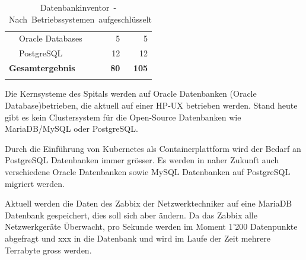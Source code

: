\begin{longtable}{@{}llrr@{}}
             & \Gls{Oracle Database}s             & 5                                                                   & 5                                            \\
             & \Gls{PostgreSQL}                   & 12                                                                  & 12                                           \\* \midrule
\multicolumn{2}{l}{\textbf{Gesamtergebnis}} & \textbf{80}                                                         & \textbf{105}                                 \\* \bottomrule
\caption{\mbox{Datenbankinventor - Nach Betriebssystemen aufgeschlüsselt}}
\label{Datenbankinventar_per_OS}
\end{longtable}

Die Kernsysteme des Spitals werden auf Oracle Datenbanken (\Gls{Oracle Database})betrieben, die aktuell auf einer \Gls{HP-UX} betrieben werden.
Stand heute gibt es kein Clustersystem für die Open-Source Datenbanken wie \Gls{MariaDB}/\Gls{MySQL} oder \Gls{PostgreSQL}\@.

Durch die Einführung von \Gls{Kubernetes} als Containerplattform wird der Bedarf an \Gls{PostgreSQL} Datenbanken immer grösser.
Es werden in naher Zukunft auch verschiedene Oracle Datenbanken sowie \Gls{MySQL} Datenbanken auf \Gls{PostgreSQL} migriert werden.

Aktuell werden die Daten des \Gls{Zabbix} der Netzwerktechniker auf eine \Gls{MariaDB} Datenbank gespeichert, dies soll sich aber ändern.
Da das \Gls{Zabbix} alle Netzwerkgeräte Überwacht, pro Sekunde werden im Moment 1'200 Datenpunkte abgefragt und xxx in die Datenbank und wird im Laufe der Zeit mehrere Terrabyte gross werden.
